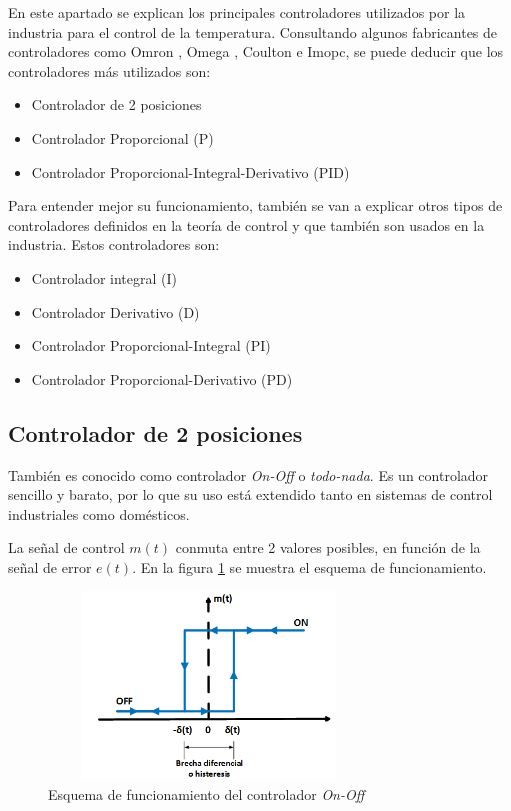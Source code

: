 	En este apartado se explican los principales controladores utilizados por la industria para el control de la temperatura. Consultando algunos fabricantes de controladores como Omron \cite{fabricante1}, Omega \cite{fabricante2}, Coulton \cite{fabricante3} e Imopc\cite{fabricante4}, se puede deducir que los controladores más utilizados son:

\begin{itemize}
	\item{Controlador de 2 posiciones}
	\item{Controlador Proporcional (P)}
	\item{Controlador Proporcional-Integral-Derivativo (PID)}
\end{itemize}

	Para entender mejor su funcionamiento, también se van a explicar otros tipos de controladores  definidos en la teoría de control \cite{control1} \cite{control2} \cite{control3} y que también son usados en la industria. Estos controladores son:

\begin{itemize}
	\item{Controlador integral (I)}
	\item{Controlador Derivativo (D)}
	\item{Controlador Proporcional-Integral (PI)}
	\item{Controlador Proporcional-Derivativo (PD)}
\end{itemize}

\subsection{Controlador de 2 posiciones}\label{sec:On-Off}
	También es conocido como controlador \textit{On-Off} o \textit{todo-nada}. Es un controlador sencillo y barato, por lo que su uso está extendido tanto en sistemas de control industriales como domésticos. 

	La señal de control $m(t)$ conmuta entre 2 valores posibles, en función de la señal de error $e(t)$. En la figura \ref{fig2_1:histeresis} se muestra el esquema de funcionamiento.

\begin{figure}[htbp]
\centering
\includegraphics[width=85mm,height=50mm]{imagenes/capitulo2/2_1_On-Off}
\caption {Esquema de funcionamiento del controlador \textit{On-Off} }
\label{fig2_1:histeresis}
\end{figure}

